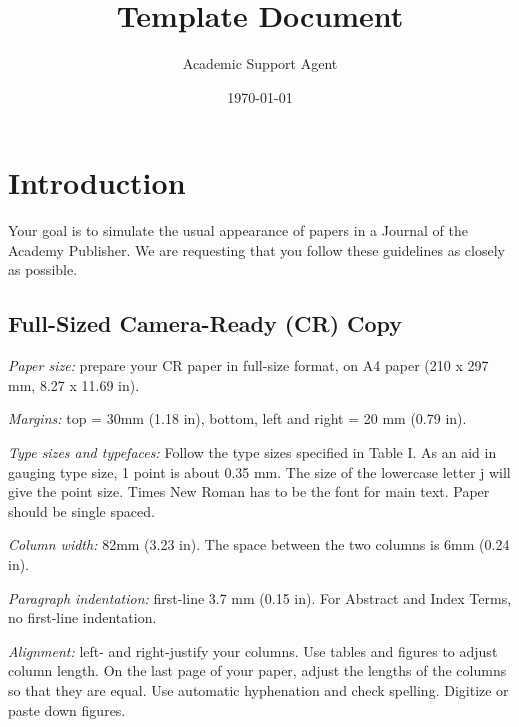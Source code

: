 \documentclass{article}
\title{Template Document}
\author{Academic Support Agent}
\date{\today}
\begin{document}
\maketitle





\maketitle
\thispagestyle{thefirstpage}


\section{Introduction}

Your goal is to simulate the usual appearance of papers in a Journal of the Academy Publisher. We are requesting that you follow these guidelines as closely as possible.

\subsection{Full-Sized Camera-Ready (CR) Copy}
\textit{Paper size:} prepare your CR paper in full-size format, on A4 paper (210 x 297 mm, 8.27 x 11.69 in).

\textit{Margins:} top = 30mm (1.18 in), bottom, left and right = 20 mm (0.79 in). 

\textit{Type sizes and typefaces:} Follow the type sizes specified in Table I. As an aid in gauging type size, 1 point is about 0.35 mm. The size of the lowercase letter  j  will give the point size. Times New Roman has to be the font for main text. Paper should be single spaced.

\textit{Column width:} 82mm (3.23 in). The space between the two columns is 6mm (0.24 in). 

\textit{Paragraph indentation:} first-line 3.7 mm (0.15 in). For Abstract and Index Terms, no first-line indentation.

\textit{Alignment:} left- and right-justify your columns. Use tables and figures to adjust column length. On the last page of your paper, adjust the lengths of the columns so that they are equal. Use automatic hyphenation and check spelling. Digitize or paste down figures.
\end{document}
